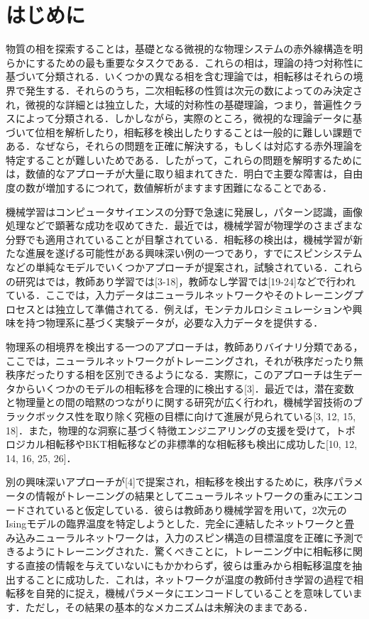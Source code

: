 \documentclass[a4paper,11pt]{jsarticle}
\begin{document}
\section{はじめに}
物質の相を探索することは，基礎となる微視的な物理システムの赤外線構造を明らかにするための最も重要なタスクである．これらの相は，理論の持つ対称性に基づいて分類される．いくつかの異なる相を含む理論では，相転移はそれらの境界で発生する．それらのうち，二次相転移の性質は次元の数によってのみ決定され，微視的な詳細とは独立した，大域的対称性の基礎理論，つまり，普遍性クラスによって分類される．しかしながら，実際のところ，微視的な理論データに基づいて位相を解析したり，相転移を検出したりすることは一般的に難しい課題である．なぜなら，それらの問題を正確に解決する，もしくは対応する赤外理論を特定することが難しいためである．したがって，これらの問題を解明するためには，数値的なアプローチが大量に取り組まれてきた．明白で主要な障害は，自由度の数が増加するにつれて，数値解析がますます困難になることである．\par
機械学習はコンピュータサイエンスの分野で急速に発展し，パターン認識，画像処理などで顕著な成功を収めてきた．最近では，機械学習が物理学のさまざまな分野でも適用されていることが目撃されている．相転移の検出は，機械学習が新たな進展を遂げる可能性がある興味深い例の一つであり，すでにスピンシステムなどの単純なモデルでいくつかアプローチが提案され，試験されている．これらの研究はでは，教師あり学習では[3-18]，教師なし学習では[19-24]などで行われている．ここでは，入力データはニューラルネットワークやそのトレーニングプロセスとは独立して準備されてる．例えば，モンテカルロシミュレーションや興味を持つ物理系に基づく実験データが，必要な入力データを提供する．\par
物理系の相境界を検出する一つのアプローチは，教師ありバイナリ分類である，ここでは，ニューラルネットワークがトレーニングされ，それが秩序だったり無秩序だったりする相を区別できるようになる．実際に，このアプローチは生データからいくつかのモデルの相転移を合理的に検出する[3]．最近では，潜在変数と物理量との間の暗黙のつながりに関する研究が広く行われ，機械学習技術のブラックボックス性を取り除く究極の目標に向けて進展が見られている[3, 12, 15, 18]．また，物理的な洞察に基づく特徴エンジニアリングの支援を受けて，トポロジカル相転移やBKT相転移などの非標準的な相転移も検出に成功した[10, 12, 14, 16, 25, 26]．\par
別の興味深いアプローチが[4]で提案され，相転移を検出するために，秩序パラメータの情報がトレーニングの結果としてニューラルネットワークの重みにエンコードされていると仮定している．彼らは教師あり機械学習を用いて，2次元のIsingモデルの臨界温度を特定しようとした．完全に連結したネットワークと畳み込みニューラルネットワークは，入力のスピン構造の目標温度を正確に予測できるようにトレーニングされた．驚くべきことに，トレーニング中に相転移に関する直接の情報を与えていないにもかかわらず，彼らは重みから相転移温度を抽出することに成功した．これは，ネットワークが温度の教師付き学習の過程で相転移を自発的に捉え，機械パラメータにエンコードしていることを意味しています．ただし，その結果の基本的なメカニズムは未解決のままである．\par
\end{document}
